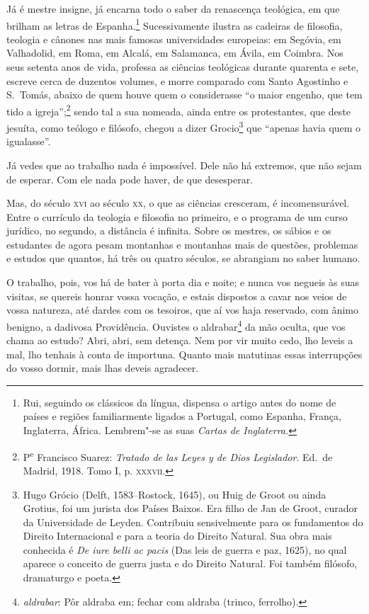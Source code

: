 Já é mestre insigne, já encarna todo o saber da renascença
teológica, em que brilham as letras de Espanha.\footnote{ Rui, seguindo
os clássicos da língua, dispensa o artigo antes do nome de países e
regiões familiarmente ligados a Portugal, como Espanha, França,
Inglaterra, África. Lembrem"-se as suas \textit{Cartas de Inglaterra.}}
Sucessivamente ilustra as cadeiras de filosofia, teologia e
cânones nas mais famosas
universidades europeias: em Segóvia, em Valhadolid, em Roma, em
Alcalá, em Salamanca, em Ávila, em Coimbra. 
Nos seus setenta anos de vida, professa as ciências
teológicas durante quarenta e sete, escreve cerca de duzentos volumes,
e morre comparado com Santo Agostinho e S.~Tomás, abaixo de quem houve quem
o considerasse ``o maior engenho, que tem tido a
igreja'';\footnote{ P\textsuperscript{e} Francisco Suarez: \textit{Tratado
de las Leyes y de Dios Legislador}. Ed.~de Madrid, 1918. Tomo I, p.
\textsc{xxxvii}.} sendo tal a sua nomeada, ainda entre os protestantes,
que deste jesuíta, como teólogo e filósofo, chegou a dizer
Grocio\footnote{ Hugo Grócio (Delft, 1583--Rostock, 1645),
ou Huig de Groot ou ainda Grotius, foi um
jurista dos Países Baixos. Era filho de Jan de Groot, 
curador da Universidade de Leyden. Contribuiu sensivelmente 
para os fundamentos do Direito Internacional e para a teoria do
Direito Natural. Sua obra mais conhecida é \textit{De iure belli ac pacis} 
(Das leis de guerra e paz, 1625), no qual aparece o conceito de guerra 
justa e do Direito Natural. Foi também filósofo, dramaturgo e poeta.} 
que ``apenas havia quem o igualasse''.

Já vedes que ao trabalho nada é impossível. Dele não há extremos,
que não sejam de esperar. Com ele nada pode haver, de que desesperar.

Mas, do século \textsc{xvi} ao século \textsc{xx}, o que as ciências cresceram, é
incomensurável. Entre o currículo da teologia e filosofia no primeiro,
e o programa de um curso jurídico, no segundo, a distância é infinita.
Sobre os mestres, os sábios e os estudantes de agora pesam montanhas e
montanhas mais de questões, problemas e estudos que quantos, há três ou
quatro séculos, se abrangiam no saber humano.

O trabalho, pois, vos há de bater à porta dia e noite; e nunca vos
negueis às suas visitas, se quereis honrar vossa vocação, e estais
dispostos a cavar nos veios de vossa natureza, até dardes com os
tesoiros, que aí vos haja reservado, com ânimo benigno, a dadivosa
Providência. Ouvistes o aldrabar\footnote{ \textit{aldrabar}: Pôr
aldraba em; fechar com aldraba (trinco, ferrolho).} da mão oculta, que vos chama
ao estudo? Abri, abri, sem detença. Nem por vir muito cedo, lho leveis
a mal, lho tenhais à conta de importuna. Quanto mais
matutinas essas interrupções do vosso dormir, mais lhas deveis agradecer.

